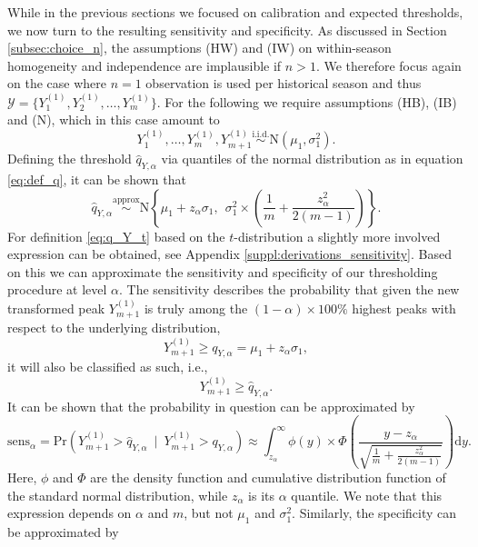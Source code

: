 \documentclass[12pt]{article}
\begin{document}
While in the previous sections we focused on calibration and expected thresholds, we now turn to the resulting sensitivity and specificity. As discussed in Section \ref{subsec:choice_n}, the assumptions (HW) and (IW) on within-season homogeneity and independence are implausible if $n > 1$. We therefore focus again on the case where $n = 1$ observation is used per historical season and thus $\mathcal{Y} = \{Y_1^{(1)}, Y_2^{(1)}, \dots, Y_m^{(1)}\}$. For the following we require assumptions (HB), (IB) and (N), which in this case amount to
\begin{equation}
Y_1^{(1)}, \dots, Y_m^{(1)}, Y_{m + 1}^{(1)} \stackrel{\text{i.i.d.}}{\sim} \text{N}(\mu_1, \sigma^2_1).
\end{equation}
Defining the threshold $\hat{q}_{Y, \alpha}$ via quantiles of the normal distribution as in equation \eqref{eq:def_q}, it can be shown that
\begin{equation}
\hat{q}_{Y, \alpha} \stackrel{\text{approx}}{\sim} \text{N}\left\{\mu_1 + z_\alpha \sigma_1,\ \ \sigma_1^2 \times \left(\frac{1}{m} + \frac{z_\alpha^2}{2(m - 1)} \right) \right\}.
\label{eq:q_Y}
\end{equation}
For definition \eqref{eq:q_Y_t} based on the $t$-distribution a slightly more involved expression can be obtained, see Appendix \ref{suppl:derivations_sensitivity}. Based on this we can approximate the sensitivity and specificity of our thresholding procedure at level $\alpha$. The sensitivity describes the probability that given the new transformed peak $Y_{m + 1}^{(1)}$ is truly among the $(1 - \alpha) \times 100\%$ highest peaks with respect to the underlying distribution,
$$
Y_{m + 1}^{(1)} \geq q_{Y, \alpha} = \mu_1 + z_\alpha \sigma_1,
$$
it will also be classified as such, i.e.,
$$
Y_{m + 1}^{(1)} \geq \hat{q}_{Y, \alpha}.
$$
It can be shown that the probability in question can be approximated by
\begin{equation}
\text{sens}_\alpha = \text{Pr}\left(Y_{m + 1}^{(1)} > \hat{q}_{Y, \alpha} \ \mid \ Y_{m + 1}^{(1)} > q_{Y, \alpha}\right) \approx \int_{z_\alpha}^\infty \phi(y) \times \Phi\left(\frac{y - z_\alpha}{\sqrt{\frac{1}{m} + \frac{z_\alpha^2}{2(m - 1)}}}\right) \text{d}y.
\label{eq:sens}
\end{equation}
Here, $\phi$ and $\Phi$ are the density function and cumulative distribution function of the standard normal distribution, while $z_\alpha$ is its $\alpha$ quantile. We note that this expression depends on $\alpha$ and $m$, but not $\mu_1$ and $\sigma^2_1$. Similarly, the specificity can be approximated by
\end{document}
